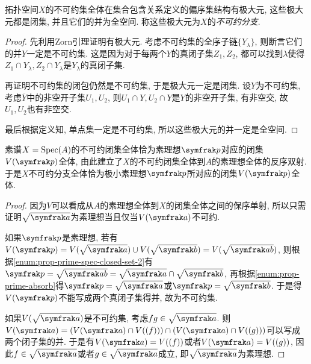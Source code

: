 \begin{proposition}
  拓扑空间$X$的不可约集全体在集合包含关系定义的偏序集结构有极大元, 这些极大元都是闭集, 并且它们的并为全空间. 称这些极大元为$X$的\emph{不可约分支}.
\end{proposition}

\begin{proof}
  先利用Zorn引理证明有极大元. 考虑不可约集的全序子链$\{Y_\lambda\}$, 则断言它们的并$Y$一定是不可约集. 这是因为对于每两个$Y$的真闭子集$Z_1, Z_2$, 都可以找到$\lambda$使得$Z_1\cap Y_\lambda, Z_2\cap Y_\lambda$是$Y_\lambda$的真闭子集.

  再证明不可约集的闭包仍然是不可约集, 于是极大元一定是闭集. 设$Y$为不可约集, 考虑$\overline{Y}$中的非空开子集$U_1, U_2$, 则$U_1\cap Y, U_2\cap Y$是$Y$的非空开子集, 有非空交, 故$U_1, U_2$也有非空交.

  最后根据定义知, 单点集一定是不可约集, 所以这些极大元的并一定是全空间.
\end{proof}

\begin{proposition}
  素谱$X=\operatorname{Spec} (A)$的不可约闭集全体恰为素理想$\ideal{p}$对应的闭集$V(\ideal{p})$全体, 由此建立了$X$的不可约闭集全体到$A$的素理想全体的反序双射. 于是$X$不可约分支全体恰为极小素理想$\ideal{p}$所对应的闭集$V(\ideal{p})$全体.
\end{proposition}

\begin{proof}
  因为$V$可以看成从$A$的素理想全体到$X$的闭集全体之间的保序单射, 所以只需证明$\sqrt{\ideal{a}}$为素理想当且仅当$V(\ideal{a})$不可约.

  如果$\ideal{p}$是素理想, 若有$V(\ideal{p})=V(\sqrt{\ideal{a}})\cup V(\sqrt{\ideal{b}})=V(\sqrt{\ideal{ab}})$, 则根据\ref{enum:prop-prime-spec-closed-set-2}有$\ideal{p}=\sqrt{\ideal{ab}}=\sqrt{\ideal{a}}\cap\sqrt{\ideal{b}}$, 再根据\ref{enum:prop-prime-absorb}得$\ideal{p}=\sqrt{\ideal{a}}$或$\ideal{p}=\sqrt{\ideal{b}}$. 于是得$V(\ideal{p})$不能写成两个真闭子集得并, 故为不可约集.

  如果$V(\sqrt{\ideal{a}})$是不可约集, 考虑$fg\in\sqrt{\ideal{a}}$. 则$V(\ideal{a})=(V(\ideal{a})\cap V((f)))\cap (V(\ideal{a})\cap V((g)))$可以写成两个闭子集的并. 于是有$V(\ideal{a})=V((f))$或者$V(\ideal{a})=V((g))$, 因此$f\in \sqrt{\ideal{a}}$或者$g\in \sqrt{\ideal{a}}$成立, 即$\sqrt{\ideal{a}}$为素理想.
\end{proof}

